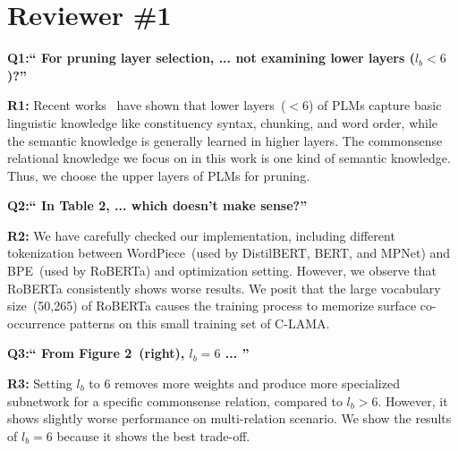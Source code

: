 \documentclass[letterpaper]{article} %
\newcommand{\KZ}[1]{\textcolor{blue}{Kenny: #1}}
\begin{document}

\section*{Reviewer \#1}

\noindent
\textbf{Q1:`` For pruning layer selection, ... not examining lower layers ($l_b<6$)?''}

\noindent
\textbf{R1:} Recent works~\cite{bert,rogers2020primer} have shown that lower layers~($<6$) of PLMs capture basic linguistic knowledge like constituency syntax, chunking, and word order, while the semantic knowledge is generally learned in higher layers. The commonsense relational knowledge we focus on in this work is one kind of semantic knowledge. Thus, we choose the upper layers of PLMs for pruning.

\noindent
\textbf{Q2:`` In Table 2, ... which doesn’t make sense?''}

\noindent
\textbf{R2:} We have carefully checked our implementation, including different tokenization between WordPiece~(used by DistilBERT, BERT, and MPNet) and BPE~(used by RoBERTa) and optimization setting. However, we observe that RoBERTa consistently shows worse results. We posit that the large vocabulary size~(50,265) of RoBERTa causes the training process to memorize surface co-occurrence patterns on this small training set of C-LAMA.

\noindent
\textbf{Q3:`` From Figure 2~(right), $l_b=6$ ... ''}

\noindent
\textbf{R3:} Setting $l_b$ to 6 removes more weights and produce more specialized subnetwork for a specific commonsense relation,  compared to $l_b>6$. However, it shows slightly worse performance on multi-relation scenario. We show the results of $l_b=6$ because it shows the best trade-off.
\end{document}
